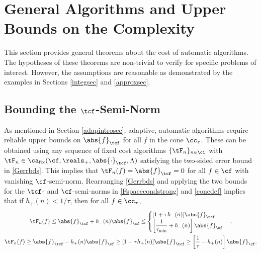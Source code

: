 \documentclass[]{elsarticle}
\DeclareMathOperator{\fix}{fix}
\theoremstyle{definition}
\theoremstyle{remark}
\newcommand{\Fnorm}[1]{\abs{#1}_{\cf}}
\newcommand{\Ftnorm}[1]{\abs{#1}_{\tcf}}
\begin{document}
\section{General Algorithms and Upper Bounds on the Complexity} \label{genthmsec}

This section provides general theorems about the cost of automatic algorithms.  The hypotheses of these theorems are non-trivial to verify for specific problems of interest.  However, the assumptions are reasonable as demonstrated by the examples in Sections \ref{integsec} and \ref{approxsec}.  

\subsection{Bounding the $\tcf$-Semi-Norm} \label{Galgosec}

As mentioned in Section \ref{adapintrosec}, adaptive, automatic algorithms require reliable upper bounds on $\Ftnorm{f}$ for all $f$ in the cone $\cc_{\tau}$. These can be obtained using any sequence of fixed cost algorithms $\{\tF_n\}_{n \in \ci}$ with $\tF_n \in \ca_{\fix}(\cf,\reals_+,\Ftnorm{\cdot},\Lambda)$ satisfying the two-sided error bound in \eqref{Gerrbds}.  This implies that $\tF_n(f)=\Ftnorm{f}=0$ for all $f \in \cf$ with vanishing $\cf$-semi-norm.  Rearranging \eqref{Gerrbds} and applying the two bounds for the $\tcf$- and $\cf$-semi-norms in \eqref{Fspacecondstrong} and \eqref{conedef} implies that if $h_{ +}(n) < 1/\tau$, then for all $f \in \cc_{\tau}$,
\begin{gather*} 
\tF_n(f) \le \Ftnorm{f} + h_{-}(n)\Fnorm{f} \le \begin{cases} [1+ \tau h_{-}(n)]\Ftnorm{f} \\
\displaystyle \left [\frac{1}{\tau_{\min}}+h_{-}(n) \right]\Fnorm{f} 
\end{cases},\\
\tF_n(f) \ge \Ftnorm{f} - h_{+}(n)\Fnorm{f} \ge [1 - \tau h_{+}(n)]\Ftnorm{f}
\ge \left [\frac{1}{\tau}-h_{+}(n) \right]\Fnorm{f}.
\end{gather*}
\end{document}
